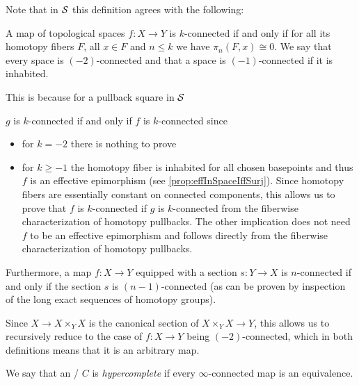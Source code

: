\begin{remark}
    Note that in $\mathcal{S}$ this definition agrees with the following:
    \begin{definition*}
        A map of topological spaces $f\colon X\to Y$ is $k$-connected if and only if for all its homotopy fibers $F$, all $x\in F$ and $n\leq k$ we have $\pi_n(F,x)\cong 0$.
        We say that every space is $(-2)$-connected and that a space is $(-1)$-connected if it is inhabited.
    \end{definition*}
    This is because for a pullback square in $\mathcal{S}$ 
    \begin{center}
    \end{center}
    $g$ is $k$-connected if and only if $f$ is $k$-connected since
    \begin{itemize}
        \item for $k=-2$ there is nothing to prove
        \item for $k\geq -1$ the homotopy fiber is inhabited for all chosen basepoints and thus $f$ is an effective epimorphism (see \cref{prop:effInSpaceIffSurj}).
            Since homotopy fibers are essentially constant on connected components, this allows us to prove that $f$ is $k$-connected if $g$ is $k$-connected from the fiberwise characterization of homotopy pullbacks.
            The other implication does not need $f$ to be an effective epimorphism and follows directly from the fiberwise characterization of homotopy pullbacks. 
    \end{itemize}
    
    Furthermore, a map $f\colon X\to Y$ equipped with a section $s\colon Y\to X$ is $n$-connected if and only if the section $s$ is $(n-1)$-connected (as can be proven by inspection of the long exact sequences of homotopy groups).
    
    Since $X\to X\times_YX$ is the canonical section of $X\times_{Y} X\to Y$, this allows us to recursively reduce to the case of $f\colon X\to Y$ being $(-2)$-connected, which in both definitions means that it is an arbitrary map.
\end{remark}
\begin{definition}
    We say that an \inftytop/ $C$ is \emph{hypercomplete} if every $\infty$-connected map is an equivalence.
\end{definition}
